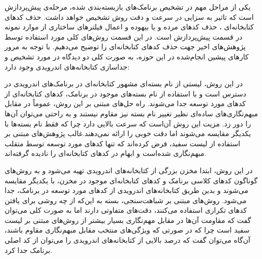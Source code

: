 یکی از مراحل مهم در تشخیص برنامک‌های بازبسته‌بندی شده، مرحله‌ی پیش‌پردازش  است که تاثیر به سزایی در سرعت و دقت روش تشخیص خواهد داشت. حذف کد‌های کتابخانه‌ای ، حذف کد‌های مرده و یا بیهوده و اعمال فیلتر‌های ساختاری از موارد نمونه در قسمت پیش‌پردازش است. در این قسمت روش‌های کلی مورد استفاده توسط پژوهش‌های اخیر جهت حذف کد‌های کتابخانه‌ای را توضیح می‌دهیم. با توجه به مرور کار‌های پیشین انجام‌شده در این حوزه، به صورت کلی دو دیدگاه در مورد تشخیص و جداسازی کتابخانه‌های اندرویدی وجود دارد: 

  در این روش، لیستی از نام بسته‌ای مشهور کتابخانه‌ای در برنامک‌های اندرویدی در دسترس است و با استفاده از نام بسته‌های موجود در برنامک، کد‌های کتابخانه‌ای از کد‌های مورد توسعه جدا می‌شوند. راه‌ حل‌های مبتنی بر این روش، عموماً در مقابل مبهم‌نگاری‌های ساده‌ای نظیر تغییر نام بسته نیز مقاوم نیستند و به راحتی می‌توان آن‌ها را دور زد. مزیت این روش آن‌است که سرعت بالایی دارد چرا که فقط نام بسته‌ها با یکدیگر مقایسه می‌شوند اما دقت خوبی را ارائه نمی‌دهند.غالب پژوهش‌های مبتنی بر استفاده از لیست سفید، فرض کرده‌اند که تنها کد‌های مورد توسعه توسط متقلب مبهم‌نگاری شده‌است و ابهام در کد‌های کتابخانه‌ای را نادیده گرفته‌اند.

  در این روش، ابتدا مخزن بزرگی از کتابخانه‌های اندرویدی تهیه می‌شود و به روش‌های گوناگون کد‌های کلاسی برنامک و کد‌های کتابخانه‌ای موجود در مخزن، با یکدیگر مقایسه می‌شوند و بدین طریق کتابخانه‌های اندرویدی از کد‌های مورد توسعه در برنامک، جدا می‌شود. روش‌های مبتنی بر شباهت‌سنجی، بسته به این‌که از چه روشی برای یافتن کد‌های تکراری استفاده می‌کنند، دقت‌های متفاوتی دارند اما به صورت کلی می‌توان گفت که مقاومت آن‌ها در مقابل مهم‌نگاری بسیار بیشتر از روش‌های مبتنی بر لیست سفید است چرا که در صورتی که ویژگی‌های منتخب مقابل مبهم‌نگاری مقاوم باشند، آن‌گاه می‌توان گفت که درصد بالایی از کتابخانه‌های اندرویدی را می‌توان از کد اصلی برنامک جدا کرد.



